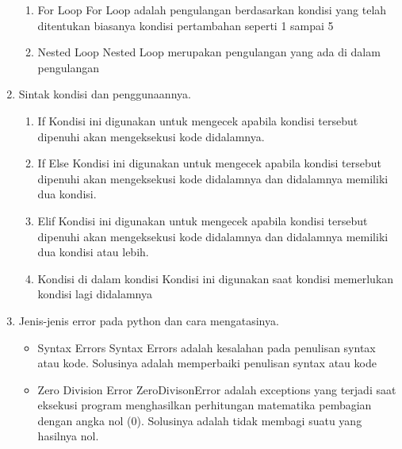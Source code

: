 \begin{enumerate}
\begin{enumerate}
\item For Loop
For Loop  adalah pengulangan berdasarkan kondisi yang telah ditentukan biasanya kondisi pertambahan seperti 1 sampai 5


\item Nested Loop
Nested Loop merupakan pengulangan yang ada di dalam pengulangan


\end{enumerate}

\item Sintak kondisi dan penggunaannya.
\begin{enumerate}
\item If
Kondisi ini digunakan untuk mengecek apabila kondisi tersebut dipenuhi akan mengeksekusi kode didalamnya.


\item If Else
Kondisi ini digunakan untuk mengecek apabila kondisi tersebut dipenuhi akan mengeksekusi kode didalamnya dan didalamnya memiliki dua kondisi.


\item Elif
Kondisi ini digunakan untuk mengecek apabila kondisi tersebut dipenuhi akan mengeksekusi kode didalamnya dan didalamnya memiliki dua kondisi atau lebih.


\item Kondisi di dalam kondisi
Kondisi ini digunakan saat kondisi memerlukan kondisi lagi didalamnya


\end{enumerate}

\item Jenis-jenis error pada python dan cara mengatasinya.
\begin{itemize}
\item Syntax Errors
Syntax Errors adalah kesalahan pada penulisan syntax atau kode. Solusinya adalah memperbaiki penulisan syntax atau kode

\item Zero Division Error
ZeroDivisonError adalah exceptions yang terjadi saat eksekusi program menghasilkan perhitungan matematika pembagian dengan angka nol (0). Solusinya adalah tidak membagi suatu yang hasilnya nol.


\end{itemize}
\end{enumerate}
